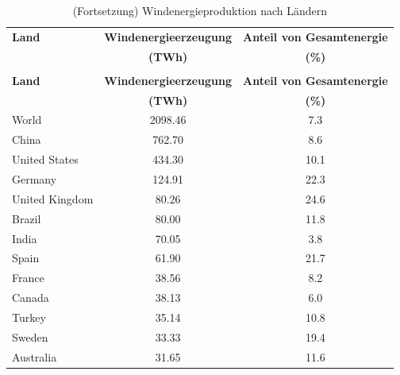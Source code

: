 \begin{longtable}{lcc}
	\caption{Windenergieproduktion nach Ländern \cite{elec}}\\
	\toprule
	\textbf{Land}             & \textbf{Windenergieerzeugung} & \textbf{Anteil von Gesamtenergie} \\
	& \textbf{(TWh)}                & \textbf{(\%)}                     \\
	\midrule
	\endfirsthead
	\caption{(Fortsetzung) Windenergieproduktion nach Ländern \cite{elec}}\\
	\toprule
	\textbf{Land}             & \textbf{Windenergieerzeugung} & \textbf{Anteil von Gesamtenergie} \\
	& \textbf{(TWh)}                & \textbf{(\%)}                     \\
	\midrule
	\endhead
	World                     & 2098.46                       & 7.3                               \\
	China                     & 762.70                        & 8.6                               \\
	United States             & 434.30                        & 10.1                              \\
	Germany                   & 124.91                        & 22.3                              \\
	United Kingdom            & 80.26                         & 24.6                              \\
	Brazil                    & 80.00                         & 11.8                              \\
	India                     & 70.05                         & 3.8                               \\
	Spain                     & 61.90                         & 21.7                              \\
	France                    & 38.56                         & 8.2                               \\
	Canada                    & 38.13                         & 6.0                               \\
	Turkey                    & 35.14                         & 10.8                              \\
	Sweden                    & 33.33                         & 19.4                              \\
	Australia                 & 31.65                         & 11.6                              \\

\end{longtable}
